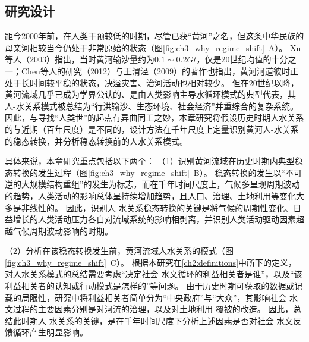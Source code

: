 \subsection{研究设计}


距今$2000$年前，在人类干预较低的时期，尽管已获“黄河”之名，但这条中华民族的母亲河相较当今仍处于非常原始的状态（图\ref{fig:ch3_why_regime_shift}~A）。
Xu等人（2003）\cite{xu2003a}指出，当时黄河输沙量约为$0.1\sim0.2 Gt$，仅是20世纪均值的十分之一；Chen等人的研究（2012）\cite{chen2012}与王渭泾（2009）\cite{WangWeiJing2009}的著作也指出，黄河河道彼时正处于长时间较平稳的状态，决溢灾害、治河活动也相对较少。
但在20世纪以降，黄河流域几乎已成为学界公认的、是由人类影响主导水循环模式的典型代表，其人-水关系模式被总结为“行洪输沙、生态环境、社会经济”并重综合的复杂系统\cite{jiang2020b}。
因此，与寻找“人类世”的起点有异曲同工之妙，本章研究将假设历史时期人水关系的与近期（百年尺度）是不同的，设计方法在千年尺度上定量识别黄河人-水关系的稳态转换，并分析稳态转换前的人水关系模式。

具体来说，本章研究重点包括以下两个：
（1）识别黄河流域在历史时期内典型稳态转换的发生过程（图\ref{fig:ch3_why_regime_shift}~B）。
稳态转换的发生以“不可逆的大规模结构重组”的发生为标志，而在千年时间尺度上，气候多呈现周期波动的趋势，人类活动的影响总体呈持续增加趋势，且人口、治理、土地利用等变化大多是非线性的\cite{GeQuanSheng2011}。
因此，识别人-水关系稳态转换的关键是将气候的周期性变化、日益增长的人类活动压力各自对流域系统的影响相剥离，并识别人类活动驱动因素超越气候周期波动影响的时期。

（2）分析在该稳态转换发生前，黄河流域人水关系的模式（图\ref{fig:ch3_why_regime_shift}~C）。
根据本研究在\ref{ch2:definitions}中所下的定义，对人水关系模式的总结需要考虑“决定社会-水文循环的利益相关者是谁”，以及“该利益相关者的认知或行动模式是怎样的”等问题。
由于历史时期可获取的数据或记载的局限性，研究中将利益相关者简单分为“中央政府”与“大众”，其影响社会-水文过程的主要因素分别是对河流的治理，以及对土地利用-覆被的改造。
因此，总结此时期人-水关系的关键，是在千年时间尺度下分析上述因素是否对社会-水文反馈循环产生明显影响。

